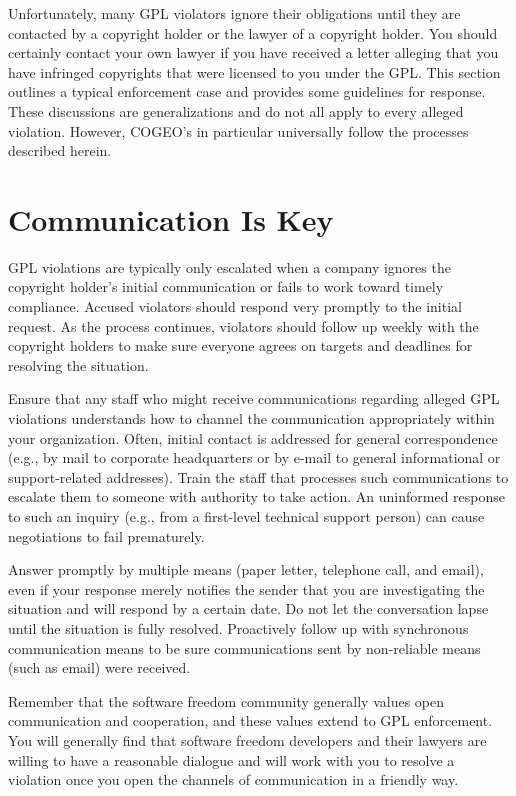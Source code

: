 Unfortunately, many GPL violators ignore their obligations until they are
contacted by a copyright holder or the lawyer of a copyright holder.  You
should certainly contact your own lawyer if you have received a letter
alleging that you have infringed copyrights that were licensed to you
under the GPL\@.  This section outlines a typical enforcement case and
provides some guidelines for response.  These discussions are
generalizations and do not all apply to every alleged violation.  However,
COGEO's in particular universally follow the processes described herein.

\section{Communication Is Key}

GPL violations are typically only escalated when a company ignores the
copyright holder's initial communication or fails to work toward timely
compliance.  Accused violators should respond very promptly to the
initial request.  As the process continues, violators should follow up weekly with the
copyright holders to make sure everyone agrees on targets and deadlines
for resolving the situation.

Ensure that any staff who might receive communications regarding alleged
GPL violations understands how to channel the communication appropriately
within your organization.  Often, initial contact is addressed for general
correspondence (e.g., by mail to corporate headquarters or by e-mail to
general informational or support-related addresses).  Train the staff that
processes such communications to escalate them to someone with authority
to take action.  An uninformed response to such an inquiry (e.g., from
a first-level technical support person) can cause negotiations to fail
prematurely.

Answer promptly by multiple means (paper letter, telephone call, and
email), even if your response merely notifies the sender that you are
investigating the situation and will respond by a certain date.  Do not
let the conversation lapse until the situation is fully resolved.
Proactively follow up with synchronous communication means to be sure
communications sent by non-reliable means (such as email) were received.

Remember that the software freedom community generally values open communication and
cooperation, and these values extend to GPL enforcement.  You will
generally find that software freedom developers and their lawyers are willing to
have a reasonable dialogue and will work with you to resolve a violation
once you open the channels of communication in a friendly way.

